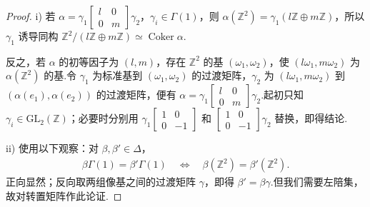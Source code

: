 \begin{proof}

i) 若 $\alpha=\gamma_1\left[\begin{smallmatrix}l&0\\0&m\end{smallmatrix}\right]\gamma_2$，$\gamma_i\in\Gamma(1)$，则 $\alpha(\mathbb Z^2)=\gamma_1(l\mathbb Z\oplus m\mathbb Z)$，所以 $\gamma_1$ 诱导同构 $\mathbb Z^2/(l\mathbb Z\oplus m\mathbb Z)\simeq\operatorname{Coker}\alpha$.

反之，若 $\alpha$ 的初等因子为 $(l,m)$，存在 $\mathbb Z^2$ 的基 $(\omega_1,\omega_2)$，使 $(l\omega_1,m\omega_2)$ 为 $\alpha(\mathbb Z^2)$ 的基.令 $\gamma_1$ 为标准基到 $(\omega_1,\omega_2)$ 的过渡矩阵，$\gamma_2$ 为 $(l\omega_1,m\omega_2)$ 到 $(\alpha(e_1),\alpha(e_2))$ 的过渡矩阵，便有 $\alpha=\gamma_1\left[\begin{smallmatrix}l&0\\0&m\end{smallmatrix}\right]\gamma_2$.起初只知 $\gamma_i\in\mathrm{GL}_2(\mathbb Z)$；必要时分别用 $\gamma_1\left[\begin{smallmatrix}1&0\\0&-1\end{smallmatrix}\right]$ 和 $\left[\begin{smallmatrix}1&0\\0&-1\end{smallmatrix}\right]\gamma_2$ 替换，即得结论.

ii) 使用以下观察：对 $\beta,\beta'\in\Delta$，
\begin{align*}
\beta\Gamma(1)=\beta'\Gamma(1)\quad\Longleftrightarrow\quad\beta(\mathbb Z^2)=\beta'(\mathbb Z^2).
\end{align*}
正向显然；反向取两组像基之间的过渡矩阵 $\gamma$，即得 $\beta'=\beta\gamma$.但我们需要左陪集，故对转置矩阵作此论证.


\end{proof}
